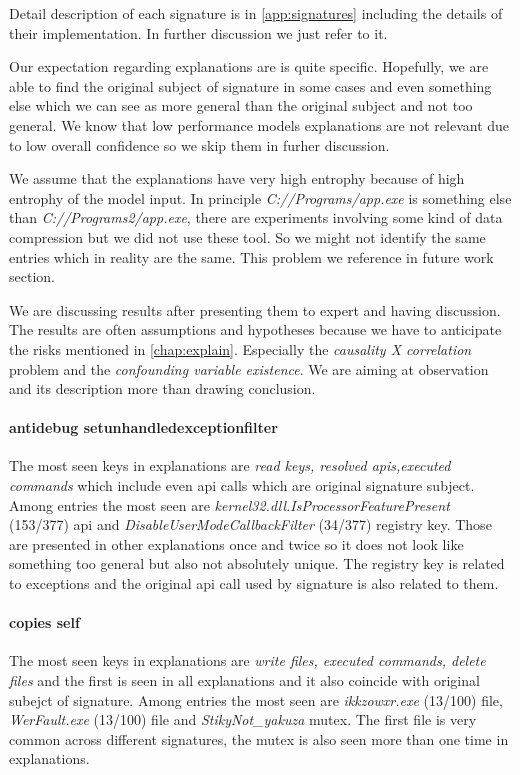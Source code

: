 Detail description of each signature is in \ref{app:signatures} including the details of their implementation. In further discussion we just refer to it.


Our expectation regarding explanations are is quite specific. Hopefully, we are able to find the original subject of signature in some cases and even something else which we can see as more general than the original subject and not too general. We know that low performance models explanations are not relevant due to low overall confidence so we skip them in furher discussion.

We assume that the explanations have very high entrophy because of high entrophy of the model input. In principle \emph{C://Programs/app.exe} is something else than \emph{C://Programs2/app.exe}, there are experiments involving some kind of data compression but we did not use these tool. So we might not identify the same entries which in reality are the same. This problem we reference in future work section.

We are discussing results after presenting them to expert and having discussion. The results are often assumptions and hypotheses because we have to anticipate the risks mentioned in \ref{chap:explain}. Especially the \emph{causality X correlation} problem and the \emph{confounding variable existence}. We are aiming at observation and its description more than drawing conclusion.


\paragraph{antidebug setunhandledexceptionfilter}
The most seen keys in explanations are \emph{read keys, resolved apis,executed commands} which include even api calls which are original signature subject. Among entries the most seen are \emph{kernel32.dll.IsProcessorFeaturePresent} (153/377) api and \emph{DisableUserModeCallbackFilter} (34/377) registry key. Those are presented in other explanations once and twice so it does not look like something too general but also not absolutely unique. The registry key is related to exceptions and the original api call used by signature is also related to them.

\paragraph{copies self}
The most seen keys in explanations are \emph{write files, executed commands, delete files} and the first is seen in all explanations and it also coincide with original subejct of signature. Among entries the most seen are \emph{ikkzowxr.exe} (13/100) file, \emph{WerFault.exe} (13/100) file and \emph{StikyNot_yakuza} mutex. The first file is very common across different signatures, the mutex is also seen more than one time in explanations.

